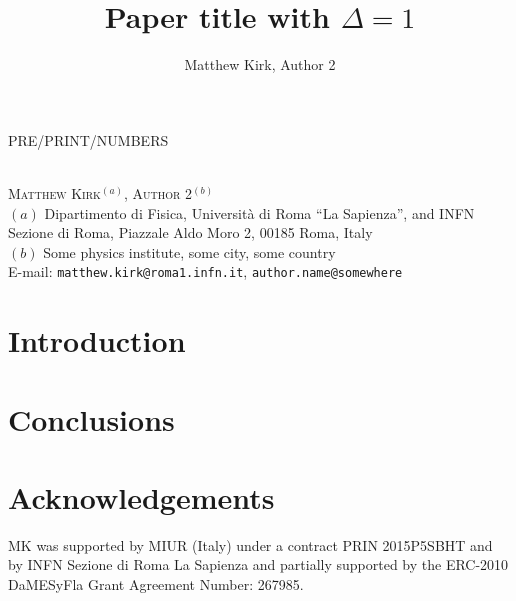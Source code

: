 \documentclass[a4paper,11pt]{article}
\author{Matthew Kirk, Author 2}
\title{Paper title with \texorpdfstring{$\Delta = 1$}{Delta = 1}}
\numberwithin{equation}{section} %
\begin{document}
\begin{flushright}
PRE/PRINT/NUMBERS
\end{flushright}

\begin{center}
\vspace*{1cm}
{\LARGE\bfseries
\makeatletter\@title\makeatother
}
\\[0.8 cm]
\textsc{
Matthew Kirk$^{(a)}$, Author 2$^{(b)}$
}
\\[0.5 cm]
{\small
$(a)$ Dipartimento di Fisica, Università di Roma ``La Sapienza'', and INFN Sezione di Roma, Piazzale Aldo Moro 2, 00185 Roma, Italy \\[0.2cm]
$(b)$ Some physics institute, some city, some country
\\[0.5 cm]
E-mail:
\texttt{matthew.kirk@roma1.infn.it},
\texttt{author.name@somewhere}
}
\end{center}

\vskip1.5cm

\renewcommand{\abstractname}{\Large\bfseries Abstract}

\begin{abstract}
\end{abstract}

{\small \tableofcontents}

\section{Introduction}
\label{sec:intro}

\section{Conclusions}
\label{sec:conclusions}

\section*{Acknowledgements}
MK was supported by MIUR (Italy) under a contract PRIN 2015P5SBHT and by INFN Sezione di Roma La Sapienza and partially supported by the ERC-2010 DaMESyFla Grant Agreement Number: 267985.



\end{document}
